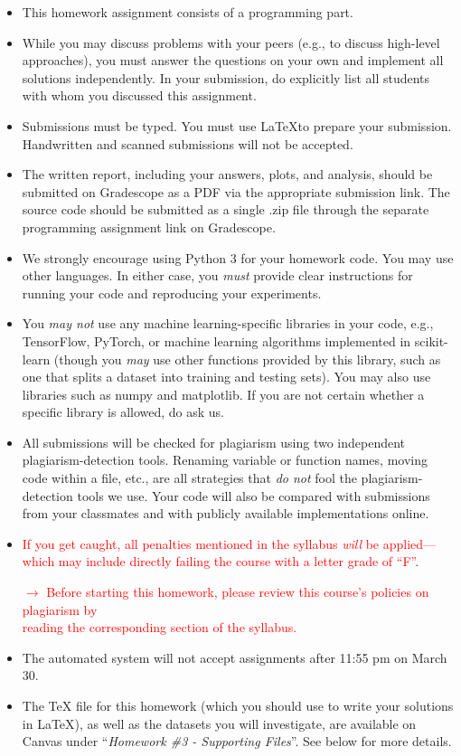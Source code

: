\documentclass{article}
\begin{document}
\begin{itemize}
    \item This homework assignment consists of a programming part. 
    \item While you may discuss problems with your peers (e.g., to discuss high-level approaches), you must answer the questions on your own and implement all solutions independently. In your submission, do explicitly list all students with whom you discussed this assignment. 
    \item Submissions must be typed. You must use \LaTeX to prepare your submission. Handwritten and scanned submissions will not be accepted. 
    \item The written report, including your answers, plots, and analysis, should be submitted on Gradescope as a PDF via the appropriate submission link. The source code should be submitted as a single .zip file through the separate programming assignment link on Gradescope.
    \item We strongly encourage using Python 3 for your homework code. You may use other languages. In either case, you \textit{must} provide clear instructions for running your code and reproducing your experiments. 
    \item You \textit{may not} use any machine learning-specific libraries in your code, e.g., TensorFlow, PyTorch, or machine learning algorithms implemented in scikit-learn (though you \textit{may} use other functions provided by this library, such as one that splits a dataset into training and testing sets). You may also use libraries such as numpy and matplotlib. If you are not certain whether a specific library is allowed, do ask us.
    \item All submissions will be checked for plagiarism using two independent plagiarism-detection tools. Renaming variable or function names, moving code within a file, etc., are all strategies that \textit{do not} fool the plagiarism-detection tools we use. Your code will also be compared with submissions from your classmates and with publicly available implementations online. 
    \item \textcolor{red}{If you get caught, all penalties mentioned in the syllabus \textit{will} be applied---which may include directly failing the course with a letter grade of ``F''}.
    \begin{center}
        \textcolor{red}{$\rightarrow$ Before starting this homework, please review this course's policies on plagiarism by  \\reading the corresponding section of the syllabus.}
    \end{center}
    \item The automated system will not accept assignments after 11:55 pm on March 30. 
    \item The TeX file for this homework (which you should use to write your solutions in \LaTeX), as well as the datasets you will investigate, are available on Canvas under ``\textit{Homework \#3 - Supporting Files}''. See below for more details.
\end{itemize}
\end{document}
